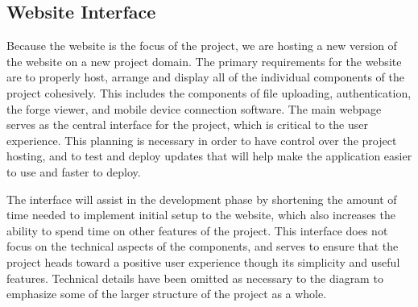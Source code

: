 \documentclass[letterpaper, 10pt, draftclsnofoot, compsoc, onecolumn]{IEEEtran}
\begin{document}
\subsection{Website Interface}
Because the website is the focus of the project, we are hosting a new version of the website on a new project domain. The primary requirements for the website are to properly host, arrange and display all of the individual components of the project cohesively. This includes the components of file uploading, authentication, the forge viewer, and mobile device connection software. The main webpage serves as the central interface for the project, which is critical to the user experience. This planning is necessary in order to have control over the project hosting, and to test and deploy updates that will help make the application easier to use and faster to deploy.

The interface will assist in the development phase by shortening the amount of time needed to implement initial setup to the website, which also increases the ability to spend time on other features of the project. This interface does not focus on the technical aspects of the components, and serves to ensure that the project heads toward a positive user experience though its simplicity and useful features. Technical details have been omitted as necessary to the diagram to emphasize some of the larger structure of the project as a whole. 
\end{document}
